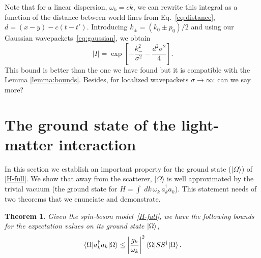 \documentclass[notitlepage, prx, preprint, amsmath,superscriptaddress,amssymb]{revtex4-1}
\newtheorem{theorem}{Theorem}[section]
\begin{document}
Note that for a linear dispersion, $\omega_k=c k$, we can rewrite this integral as a function of the distance between world lines from Eq.\ \eqref{eq:distance}, $d=(x-y)-c(t-t')$.
Introducing $k_{\pm}=(k_0 \pm p_0)/2$ and using our Gaussian wavepackets\ \eqref{eq:gaussian}, we obtain
\begin{equation}
|I| = \exp\left[-\frac{k_-^2}{\sigma^2}-\frac{d^2\sigma^2}{4}\right].
\label{eq:free-commutator}
\end{equation}
This bound is better than the one we have found but it is compatible with the Lemma \ref{lemma:bounds}.
{\color{red} Besides, for localized wavepackets $\sigma \to \infty$: can we say more?}



\section{The ground state of the light-matter interaction}


In this section we establish an important property for the ground state ($|\Omega\rangle$)   of \eqref{H-full}.  We show that  away from the scatterer,  $|\Omega\rangle$ is well approximated by the trivial vacuum  (the ground state for $H= \int \; dk \, \omega_k \, a_k^\dagger a_k$).  This statement needs of two theorems that we enunciate and demonstrate.


\begin{theorem}
\label{th:bound-a}
Given the spin-boson model\ \eqref{H-full}, we have the following bounds for the expectation values on its ground state $\ket{\Omega}$,
\begin{equation}
\label{bound-nk}
\braket{\Omega|a_k^{\dagger}a_k|\Omega} \leq \left|\frac{g_k}{\omega_k}\right|^{2}
\braket{\Omega|S S^\dagger |\Omega} .
\end{equation}
\end{theorem}
\end{document}

